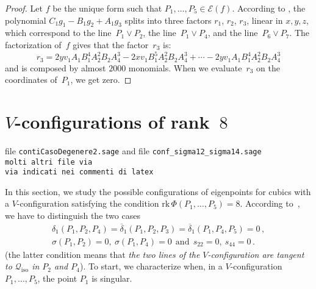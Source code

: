 \documentclass{amsart}
\theoremstyle{plain}
\theoremstyle{definition}
\newcommand{\iso}{\mathcal{Q}_{\mathrm{iso}}}
\newcommand{\Eig}[1]{\mathcal{E}\!\left( {#1} \right)}
\newcommand{\rk}{\ensuremath{\mathrm{rk}}}
\begin{document}
\begin{proof}
Let $f$ be the unique form such that $P_1, \dotsc, P_5 \in \Eig{f}$.
According to , the polynomial
$C_1g_1-B_1g_2+A_1g_3$ splits into three factors $r_1$, $r_2$, $r_3$,
linear in $x, y, z$, which
correspond to the line~$P_1 \vee P_2$, the line~$P_1 \vee P_4$, and the line~$P_6 \vee P_7$.
The factorization of~$f$ gives that the factor~$r_3$ is:
%
\[
  r_3 = 2yv_1A_1B_1^4A_2^2B_2A_4^3-2xv_1B_1^5A_2^2B_2A_4^3+\cdots
  -2 yv_1A_1B_1^4A_2^2B_2A_4^3
\]
%
and is composed by almost $2000$ monomials. When we
evaluate~$r_3$ on the coordinates of~$P_1$, we get zero.
\end{proof}


\section{\texorpdfstring{$V$}{V}-configurations of rank~\texorpdfstring{$8$}{8}}
\label{rank_8}
file \verb+contiCasoDegenere2.sage+ and file
\verb+conf_sigma12_sigma14.sage+\\
\verb+molti altri file via +\\
\verb+via indicati nei commenti di latex+

In this section, we study the possible configurations of
eigenpoints for cubics with a $V$-configuration
satisfying the condition $\rk \, \Phi(P_1, \dots, P_5) = 8$. According
to~, we have to distinguish the two cases
%
\begin{gather}
  \delta_1(P_1, P_2, P_4)=\overline{\delta}_1(P_1, P_2, P_3) =
  \overline{\delta}_1(P_1, P_4, P_5) = 0 \,,
  \label{rk8_1} \\
  \sigma(P_1, P_2) = 0, \ \sigma(P_1, P_4) = 0 \ \ \mbox{and} \ \ s_{22} = 0,
  \ s_{44} = 0 \,.
  \label{rk8_2}
\end{gather}
%
(the latter condition means that \emph{the two lines of
the $V$-configuration are tangent to $\iso$ in $P_2$ and $P_4$}).
%
To start, we characterize when, in a $V$-configuration
$P_1, \dotsc, P_5$, the point $P_1$ is singular.
\end{document}
